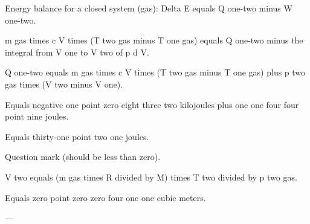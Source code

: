 Energy balance for a closed system (gas):  
Delta E equals Q one-two minus W one-two.  

m gas times c V times (T two gas minus T one gas) equals Q one-two minus the integral from V one to V two of p d V.  

Q one-two equals m gas times c V times (T two gas minus T one gas) plus p two gas times (V two minus V one).  

Equals negative one point zero eight three two kilojoules plus one one four four point nine joules.  

Equals thirty-one point two one joules.  

Question mark (should be less than zero).  

V two equals (m gas times R divided by M) times T two divided by p two gas.  

Equals zero point zero zero four one one cubic meters.  

---